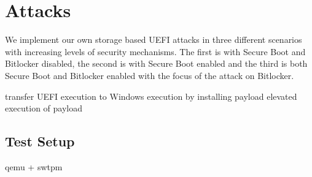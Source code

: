 
\chapter{Attacks}

We implement our own storage based UEFI attacks in three different scenarios with increasing levels of security mechanisms. The first is with Secure Boot and Bitlocker disabled, the second is with Secure Boot enabled and the third is both Secure Boot and Bitlocker enabled with the focus of the attack on Bitlocker.

transfer UEFI execution to Windows execution by installing payload
elevated execution of payload

\section{Test Setup}
qemu + swtpm



